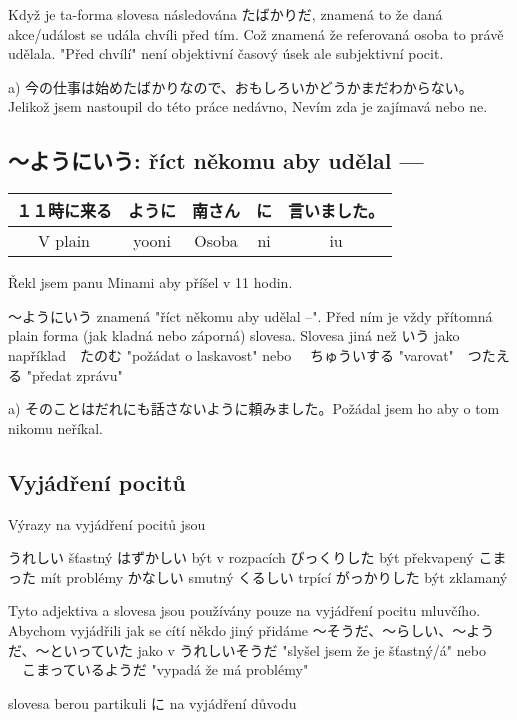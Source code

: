 Když je ta-forma slovesa následována  たばかりだ, znamená to že daná akce/událost se udála chvíli před tím. Což znamená že referovaná osoba to právě udělala. "Před chvílí" není objektivní časový úsek ale subjektivní pocit.

a) 今の仕事は始めたばかりなので、おもしろいかどうかまだわからない。Jelikož jsem nastoupil do této práce nedávno, Nevím zda je zajímavá nebo ne.

\subsection{〜ようにいう: říct někomu aby udělal ---}

\begin{center}
\begin{tabular}{||c|c||c|c||c||}
\hline
１１時に来る&ように&南さん&に&言いました。\\
\hline
V plain&yooni&Osoba&ni&iu\\
\hline
\end{tabular}
\end{center}
Řekl jsem panu Minami aby příšel v 11 hodin. 

〜ようにいう znamená "říct někomu aby udělal --". Před ním je vždy přítomná plain forma (jak kladná nebo záporná) slovesa. Slovesa jiná než いう jako například　たのむ "požádat o laskavost" nebo 　ちゅういする "varovat"　つたえる "předat zprávu"

a) そのことはだれにも話さないように頼みました。Požádal jsem ho aby o tom nikomu neříkal.



\subsection{Vyjádření pocitů}
Výrazy na vyjádření pocitů jsou

うれしい šťastný
はずかしい být v rozpacích
びっくりした být překvapený
こまった mít problémy
かなしい  smutný
くるしい trpící
がっかりした být zklamaný

Tyto adjektiva  a slovesa jsou používány pouze na vyjádření pocitu mluvčího. Abychom vyjádřili jak se cítí někdo jiný přidáme 〜そうだ、〜らしい、〜ようだ、〜といっていた jako v うれしいそうだ "slyšel jsem že je šťastný/á" nebo 　こまっているようだ "vypadá že má problémy"

slovesa berou partikuli に na vyjádření důvodu


